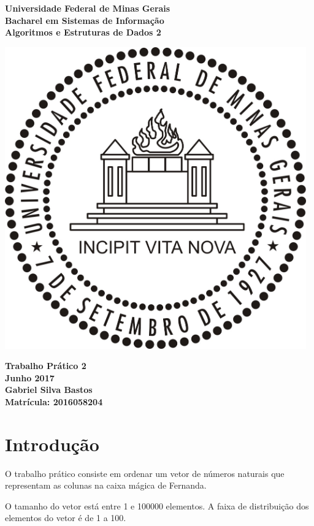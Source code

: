 \documentclass{article}
\begin{document}
\begin{titlepage}
  \centering
  
  \vfill{
    \bfseries\Huge
    Universidade Federal de Minas Gerais\\[5pt]
    \bfseries\Large
    Bacharel em Sistemas de Informação \\
    Algoritmos e Estruturas de Dados 2\\
  }
  
  \vfill
  
  \includegraphics[width=13cm]{images/ufmg_logo.jpg}
  
  \vfill{
    \bfseries\Large
    Trabalho Prático 2\\
    Junho 2017\\
  }
  \vfill{
    \bfseries\large
    Gabriel Silva Bastos\\[5pt]
    Matrícula: 2016058204
  }
\end{titlepage}


\section{Introdução}
O trabalho prático consiste em ordenar um vetor de números naturais que representam as colunas na caixa mágica de Fernanda.

O tamanho do vetor está entre 1 e 100000 elementos. A faixa de distribuição dos elementos do vetor é de 1 a 100.
\end{document}
